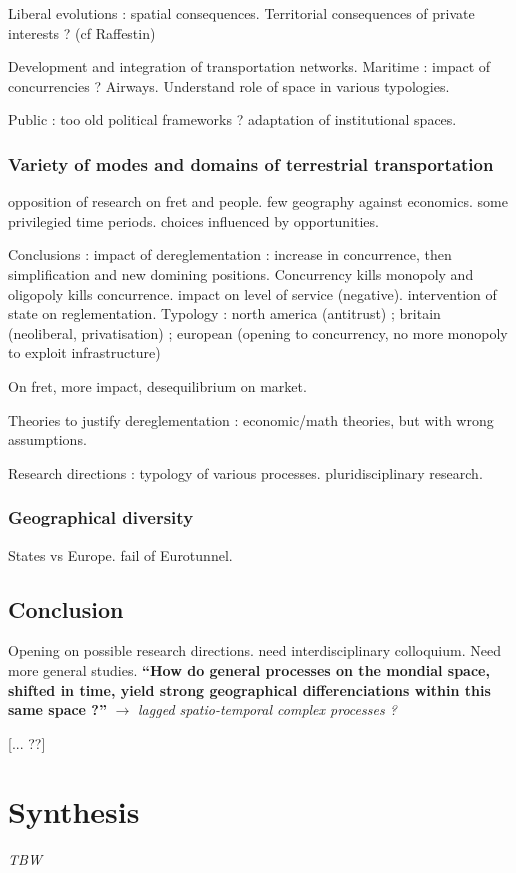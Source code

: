 Liberal evolutions : spatial consequences. Territorial consequences of private interests ? (cf Raffestin)

Development and integration of transportation networks. Maritime : impact of concurrencies ? Airways. Understand role of space in various typologies.

Public : too old political frameworks ? adaptation of institutional spaces.

\subsubsection{Variety of modes and domains of terrestrial transportation}

opposition of research on fret and people. few geography against economics. some privilegied time periods. choices influenced by opportunities.

Conclusions : impact of dereglementation : increase in concurrence, then simplification and new domining positions. Concurrency kills monopoly and oligopoly kills concurrence. impact on level of service (negative). intervention of state on reglementation. Typology : north america (antitrust) ; britain (neoliberal, privatisation) ; european (opening to concurrency, no more monopoly to exploit infrastructure)

On fret, more impact, desequilibrium on market.

Theories to justify dereglementation : economic/math theories, but with wrong assumptions.

Research directions : typology of various processes. pluridisciplinary research.

\subsubsection{Geographical diversity}

States vs Europe. fail of Eurotunnel.

\subsection{Conclusion}

Opening on possible research directions. need interdisciplinary colloquium. Need more general studies. \textbf{``How do general processes on the mondial space, shifted in time, yield strong geographical differenciations within this same space ?''} $\rightarrow$ \textit{lagged spatio-temporal complex processes ?}

[... ??]

\section{Synthesis}

\textit{TBW}











